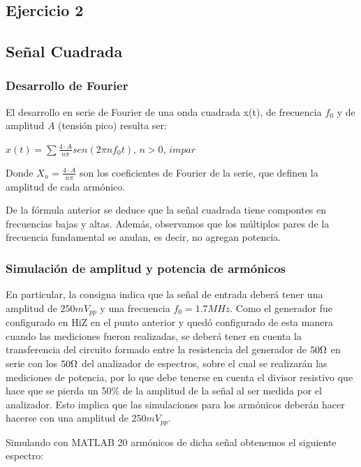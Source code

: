\documentclass[../../labo_tp5_main.tex]{subfiles}
\begin{document}
\subsection{Ejercicio 2}

\subsection{Señal Cuadrada}

\subsubsection{Desarrollo de Fourier}
El desarrollo en serie de Fourier de una onda cuadrada x(t), de frecuencia $f_0$ y de amplitud $A$ (tensión pico) resulta ser: \par
\begin{center}
$x(t) = \sum\frac{4\cdot A}{n\pi}sen(2\pi nf_{0}t),\,n>0,\,impar$
\end{center}
Donde $X_n = \frac{4\cdot A}{n\pi}$ son los coeficientes de Fourier de la serie, que definen la amplitud de cada armónico.\par
De la fórmula anterior se deduce que la señal cuadrada tiene compontes en frecuencias bajas y altas. Además, observamos que los múltiplos pares de la frecuencia fundamental se anulan, es decir, no agregan potencia.\par

\subsubsection{Simulación de amplitud y potencia de armónicos}

En particular, la consigna indica que la señal de entrada deberá tener una amplitud de $250mV_{pp}$ y una frecuencia $f_0 = 1.7MHz$. Como el generador fue configurado en HiZ en el punto anterior y quedó configurado de esta manera cuando las mediciones fueron realizadas, se deberá tener en cuenta la transferencia del circuito formado entre la resistencia del generador de $50\ohm$  en serie con los $50\ohm$ del analizador de espectros, sobre el cual se realizarán las mediciones de potencia, por lo que debe tenerse en cuenta el divisor resistivo que hace que se pierda un 50\% de la amplitud de la señal al ser medida por el analizador. Esto implica que las simulaciones para los armónicos deberán hacer hacerse con una amplitud de $250mV_{pp}$.\par
Simulando con MATLAB 20 armónicos de dicha señal obtenemos el siguiente espectro: \par
\end{document}
